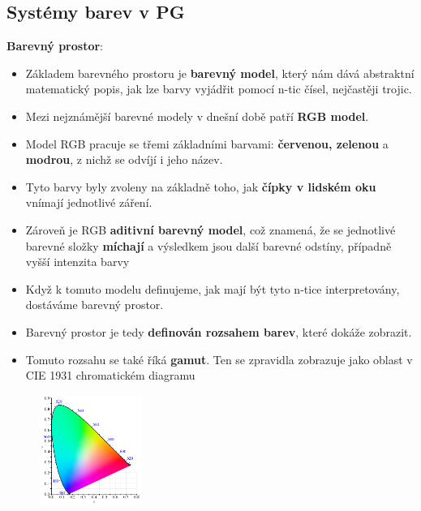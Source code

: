 \subsection{Systémy barev v PG}
\textbf{Barevný prostor}:
\begin{itemize}
	\item Základem barevného prostoru je \textbf{barevný model}, který nám dává abstraktní matematický popis, jak lze barvy vyjádřit pomocí n-tic čísel, nejčastěji trojic. 
	\item Mezi nejznámější barevné modely v dnešní době patří \textbf{RGB model}. 
	\item Model RGB pracuje se třemi základními barvami: \textbf{červenou, zelenou} a \textbf{modrou}, z nichž se odvíjí i jeho název. 
	\item Tyto barvy byly zvoleny na základně toho, jak \textbf{čípky v lidském oku} vnímají jednotlivé záření. 
	\item Zároveň je RGB \textbf{aditivní barevný model}, což znamená, že se jednotlivé barevné složky \textbf{míchají} a výsledkem jsou další barevné odstíny, případně vyšší intenzita barvy
	\item Když k tomuto modelu definujeme, jak mají být tyto n-tice interpretovány, dostáváme barevný prostor. 
	\item Barevný prostor je tedy \textbf{definován rozsahem barev}, které dokáže zobrazit. 
	\item Tomuto rozsahu se také říká \textbf{gamut}. Ten se zpravidla zobrazuje jako oblast v CIE 1931 chromatickém diagramu 
\end{itemize}
\begin{figure}[H]
\centering
\includegraphics[width=0.3\textwidth]{assets/1_rgb_gamut}
\end{figure}

